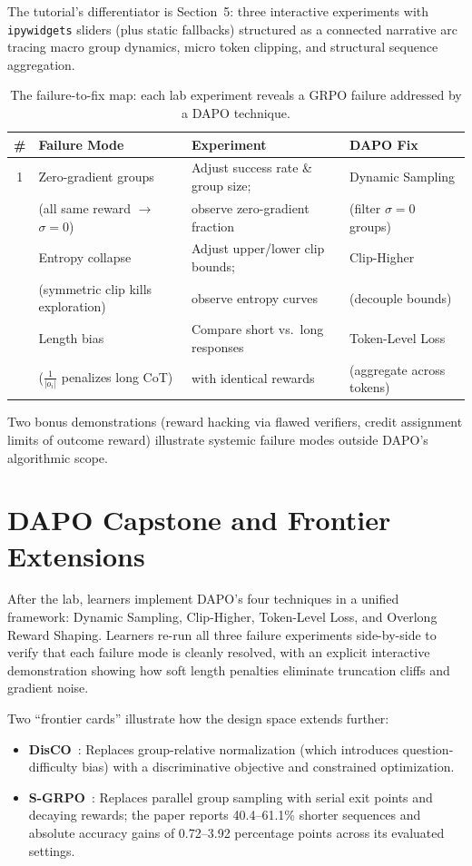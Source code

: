 \documentclass{article}
\begin{document}
The tutorial's differentiator is Section~5: three interactive experiments with \texttt{ipywidgets} sliders (plus static fallbacks) structured as a connected narrative arc tracing macro group dynamics, micro token clipping, and structural sequence aggregation.

\begin{table}[h]
\centering
\small
\begin{tabular}{@{}clll@{}}
\toprule
\textbf{\#} & \textbf{Failure Mode} & \textbf{Experiment} & \textbf{DAPO Fix} \\
\midrule
1 & Zero-gradient groups & Adjust success rate \& group size; & Dynamic Sampling \\
  & (all same reward $\to$ $\sigma=0$) & observe zero-gradient fraction & (filter $\sigma=0$ groups) \\
\addlinespace
2 & Entropy collapse & Adjust upper/lower clip bounds; & Clip-Higher \\
  & (symmetric clip kills exploration) & observe entropy curves & (decouple bounds) \\
\addlinespace
3 & Length bias & Compare short vs.\ long responses & Token-Level Loss \\
  & ($\frac{1}{|o_i|}$ penalizes long CoT) & with identical rewards & (aggregate across tokens) \\
\bottomrule
\end{tabular}
\caption{The failure-to-fix map: each lab experiment reveals a GRPO failure addressed by a DAPO technique.}
\end{table}

Two bonus demonstrations (reward hacking via flawed verifiers, credit assignment limits of outcome reward) illustrate systemic failure modes outside DAPO's algorithmic scope.

\section{DAPO Capstone and Frontier Extensions}

After the lab, learners implement DAPO's four techniques in a unified framework: Dynamic Sampling, Clip-Higher, Token-Level Loss, and Overlong Reward Shaping. Learners re-run all three failure experiments side-by-side to verify that each failure mode is cleanly resolved, with an explicit interactive demonstration showing how soft length penalties eliminate truncation cliffs and gradient noise.

Two ``frontier cards'' illustrate how the design space extends further:
\begin{itemize}[nosep,leftmargin=1.5em]
  \item \textbf{DisCO}~\cite{disco}: Replaces group-relative normalization (which introduces question-difficulty bias) with a discriminative objective and constrained optimization.
  \item \textbf{S-GRPO}~\cite{sgrpo}: Replaces parallel group sampling with serial exit points and decaying rewards; the paper reports 40.4--61.1\% shorter sequences and absolute accuracy gains of 0.72--3.92 percentage points across its evaluated settings.
\end{itemize}
\end{document}
